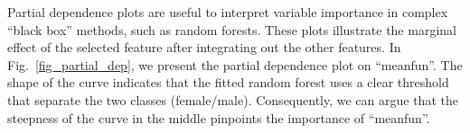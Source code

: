 Partial dependence plots are useful to interpret variable importance in complex ``black box'' methods, such as random forests. These plots illustrate the marginal effect of the selected feature after integrating out the other features. In Fig.~\ref{fig_partial_dep}, we present the partial dependence plot on ``meanfun''. The shape of the curve indicates that the fitted random forest uses a clear threshold that separate the two classes (female/male). Consequently, we can argue that the steepness of the curve in the middle pinpoints the importance of ``meanfun''. 
